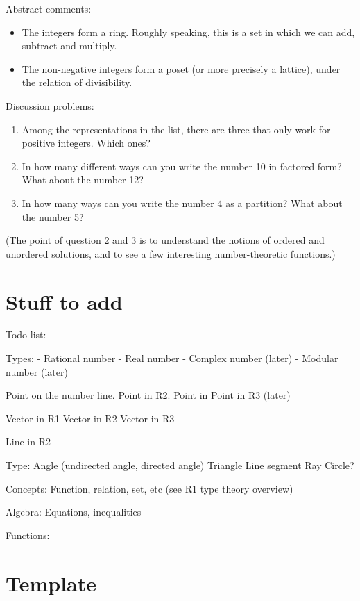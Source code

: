 \documentclass[12pt]{amsart}
\begin{document}
Abstract comments:
\smallskip
\begin{itemize}
\item The integers form a ring. Roughly speaking, this is a set in which we can add, subtract and multiply.
\item The non-negative integers form a poset (or more precisely a lattice), under the relation of divisibility.
\end{itemize}
\bigskip

Discussion problems:
\smallskip
\begin{enumerate}
\item Among the representations in the list, there are three that only work for positive integers. Which ones?
\item In how many different ways can you write the number 10 in factored form? What about the number 12?
\item In how many ways can you write the number 4 as a partition? What about the number 5?
\end{enumerate}
(The point of question 2 and 3 is to understand the notions of ordered and unordered solutions, and to see a few interesting number-theoretic functions.)
\bigskip



\newpage
\section{Stuff to add}

Todo list:

Types:
- Rational number
- Real number
- Complex number (later)
- Modular number (later)

Point on the number line.
Point in R2.
Point in Point in R3 (later)

Vector in R1
Vector in R2
Vector in R3

Line in R2

Type: Angle (undirected angle, directed angle)
Triangle
Line segment
Ray
Circle?

Concepts: Function, relation, set, etc (see R1 type theory overview)

Algebra: Equations, inequalities

Functions:


\newpage
\section{Template}



\end{document}
